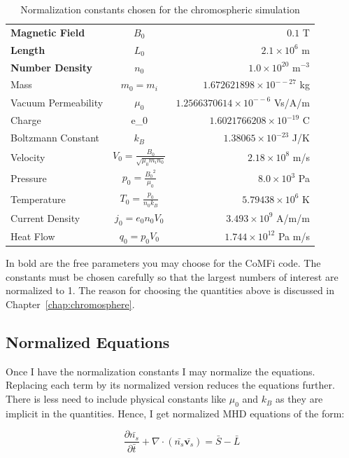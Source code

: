 \documentclass[12pt,upcase]{umlthesis}
\begin{document}
\begin{table}[h]\label{tab:normalization}
\centering
\caption[Normalization Constants]{Normalization constants chosen for the chromospheric simulation}
\begin{tabular}[]{l  c  r}
	\toprule
	\textbf{Magnetic Field} & $B_0$ & $0.1$ T\\
	\textbf{Length} & $L_0$ & $2.1 \times 10^6$ m \\
	\textbf{Number Density} & $n_0$ & $1.0\times 10^{20}$ m$^{-3}$ \\
	Mass & $m_0 = m_i$ & $1.672621898\times 10^{-−27}$ kg \\
	Vacuum Permeability & $\mu_0$ & $1.2566370614\times 10^{-−6}$ Vs/A/m \\
	Charge & e_0 & $1.6021766208\times10^{-19}$ C \\
	Boltzmann Constant & $k_B$ & $1.38065\times10^{-23}$ J/K\\
	Velocity & $V_0=\frac{B_0}{\sqrt{\mu_0 m_i n_0}}$ & $2.18 \times 10^{8}$ m/s\\
	Pressure & $p_0= \frac{{B_0}^2}{\mu_0}$ & $8.0 \times 10^3$ Pa \\
	Temperature & $T_0 = \frac{p_0}{n_0 k_B} $ & $5.79438\times10^6$ K\\
	Current Density & $j_0 = e_0 n_0 V_0$ & $3.493\times10^9$ A/m/m \\
	Heat Flow & $q_0 = p_0 V_0$ & $1.744\times10^{12}$ Pa m/s \\
	\bottomrule
\end{tabular}
\end{table}

In bold are the free parameters you may choose for the CoMFi code. The constants must be chosen carefully so that the largest numbers of interest are normalized to 1. The reason for choosing the quantities above is discussed in Chapter~\ref{chap:chromosphere}.

\subsection{Normalized Equations}\label{sec:normequations}

Once I have the normalization constants I may normalize the equations. Replacing each term by its normalized version reduces the equations further. There is less need to include physical constants like $\mu_0$ and $k_B$ as they are implicit in the quantities. Hence, I get normalized MHD equations of the form:

\begin{equation}\label{eq:normcontinuity}
	\frac{\partial \bar{n_s}}{\partial \bar{t}} + \nabla \cdot (\bar{n_s} \bar{\textbf{v}_s}) = \bar{S} - \bar{L}
\end{equation}
\end{document}
